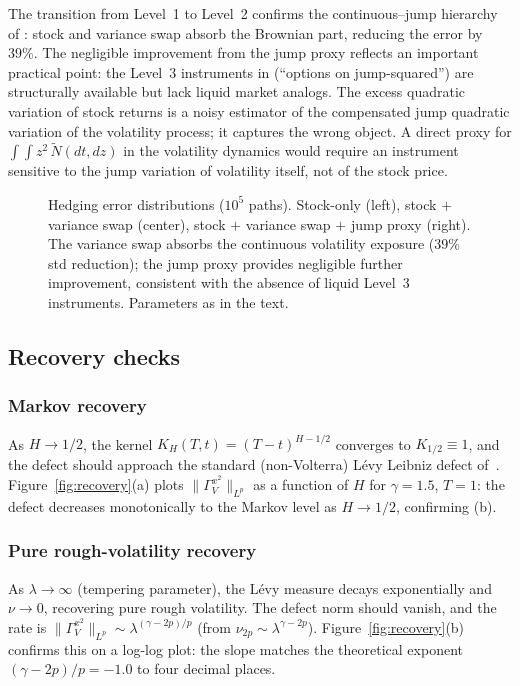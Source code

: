 \documentclass[11pt,a4paper]{article}
\theoremstyle{plain}
\theoremstyle{definition}
\theoremstyle{remark}
\newcommand{\Ntilde}{\widetilde{N}}
\begin{document}
The transition from Level~1 to Level~2 confirms the
continuous--jump hierarchy of :
stock and variance swap absorb the Brownian part, reducing
the error by $39\%$.  The negligible improvement from the
jump proxy reflects an important practical point: the
Level~3 instruments in 
(``options on jump-squared'') are structurally available
but lack liquid market analogs.  The excess quadratic
variation of stock returns is a noisy estimator of the
compensated jump quadratic variation of the volatility
process; it captures the wrong object.
A direct proxy for $\int\!\!\int z^2\,\Ntilde(dt,dz)$
in the volatility dynamics would require an instrument
sensitive to the jump variation of volatility itself,
not of the stock price.

\begin{figure}[ht]
\centering
\caption{Hedging error distributions ($10^5$ paths).
Stock-only (left), stock $+$ variance swap (center),
stock $+$ variance swap $+$ jump proxy (right).
The variance swap absorbs the continuous volatility
exposure (39\% std reduction);
the jump proxy provides negligible further improvement,
consistent with the absence of liquid Level~3 instruments.
Parameters as in the text.}
\label{fig:hedging}
\end{figure}


\subsection{Recovery checks}

\subsubsection{Markov recovery}

As $H \to 1/2$, the kernel $K_H(T,t) = (T-t)^{H-1/2}$
converges to $K_{1/2} \equiv 1$, and the defect should
approach the standard (non-Volterra) L\'evy Leibniz
defect of~\cite{Fontes2026d}.
Figure~\ref{fig:recovery}(a) plots
$\|\Gamma_V^{x^2}\|_{L^p}$ as a function of $H$
for $\gamma = 1.5$, $T = 1$: the defect decreases
monotonically to the Markov level as $H \to 1/2$,
confirming (b).

\subsubsection{Pure rough-volatility recovery}

As $\lambda \to \infty$ (tempering parameter), the
L\'evy measure decays exponentially and $\nu \to 0$,
recovering pure rough volatility.  The defect norm
should vanish, and the rate is
$\|\Gamma_V^{x^2}\|_{L^p} \sim \lambda^{(\gamma - 2p)/p}$
(from $\nu_{2p} \sim \lambda^{\gamma - 2p}$).
Figure~\ref{fig:recovery}(b) confirms this on a log-log
plot: the slope matches the theoretical exponent
$(\gamma - 2p)/p = -1.0$ to four decimal places.
\end{document}
